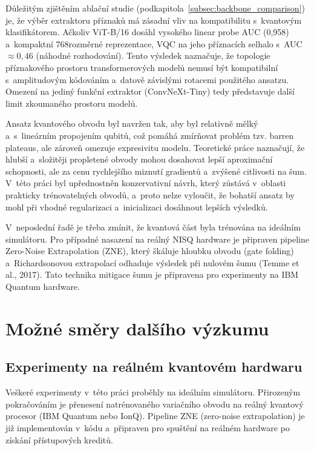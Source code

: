 \documentclass[12pt, a4paper]{report}
\begin{document}
Důležitým zjištěním ablační studie (podkapitola~\ref{subsec:backbone_comparison}) je, že výběr extraktoru příznaků má zásadní vliv na kompatibilitu s~kvantovým klasifikátorem. Ačkoliv ViT-B/16 dosáhl vysokého linear probe AUC (0,958) a~kompaktní 768rozměrné reprezentace, VQC na jeho příznacích selhalo s~AUC $\approx 0{,}46$ (náhodné rozhodování). Tento výsledek naznačuje, že topologie příznakového prostoru transformerových modelů nemusí být kompatibilní s~amplitudovým kódováním a~datově závislými rotacemi použitého ansatzu. Omezení na jediný funkční extraktor (ConvNeXt-Tiny) tedy představuje další limit zkoumaného prostoru modelů.

Ansatz kvantového obvodu byl navržen tak, aby byl relativně mělký a~s~lineárním propojením qubitů, což pomáhá zmírňovat problém tzv. barren plateaus, ale zároveň omezuje expresivitu modelu. Teoretické práce naznačují, že hlubší a~složitěji propletené obvody mohou dosahovat lepší aproximační schopnosti, ale za cenu rychlejšího miznutí gradientů a~zvýšené citlivosti na šum. V~této práci byl upřednostněn konzervativní návrh, který zůstává v~oblasti prakticky trénovatelných obvodů, a~proto nelze vyloučit, že bohatší ansatz by mohl při vhodné regularizaci a~inicializaci dosáhnout lepších výsledků.

V~neposlední řadě je třeba zmínit, že kvantová část byla trénována na ideálním simulátoru. Pro případné nasazení na reálný NISQ hardware je připraven pipeline Zero-Noise Extrapolation (ZNE), který škáluje hloubku obvodu (gate folding) a~Richardsonovou extrapolací odhaduje výsledek při nulovém šumu (Temme et al., 2017). Tato technika mitigace šumu je připravena pro experimenty na IBM Quantum hardware.

\section{Možné směry dalšího výzkumu} \label{sec:future_work}

\subsection{Experimenty na reálném kvantovém hardwaru}

Veškeré experimenty v~této práci proběhly na ideálním simulátoru. Přirozeným pokračováním je přenesení natrénovaného variačního obvodu na reálný kvantový procesor (IBM Quantum nebo IonQ). Pipeline ZNE (zero-noise extrapolation) je již implementován v~kódu a~připraven pro spuštění na reálném hardware po získání přístupových kreditů.
\end{document}
